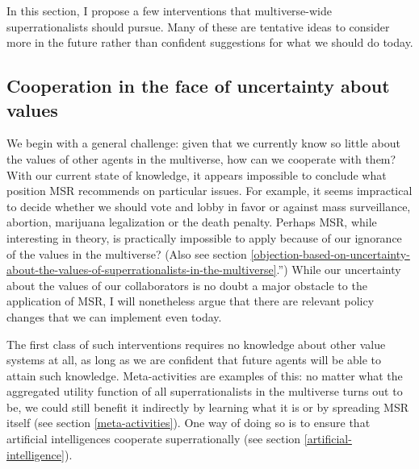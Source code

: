 In this section, I propose a few interventions that multiverse-wide
superrationalists should pursue. Many of these are tentative ideas to
consider more in the future rather than confident suggestions for what
we should do today.

\hypertarget{cooperation-in-the-face-of-uncertainty-about-values}{\subsection{Cooperation
in the face of uncertainty about
values}\label{cooperation-in-the-face-of-uncertainty-about-values}}

We begin with a general challenge: given that we currently know so
little about the values of other agents in the multiverse, how can we
cooperate with them? With our current state of knowledge, it appears
impossible to conclude what position MSR recommends on particular
issues. For example, it seems impractical to decide whether we should
vote and lobby in favor or against mass surveillance, abortion,
marijuana legalization or the death penalty. Perhaps MSR, while
interesting in theory, is practically impossible to apply because of our
ignorance of the values in the multiverse? (Also see section
\ref{objection-based-on-uncertainty-about-the-values-of-superrationalists-in-the-multiverse}.'') While our uncertainty about the values of our
collaborators is no doubt a major obstacle to the application of MSR, I
will nonetheless argue that there are relevant policy changes that we
can implement even today.

The first class of such interventions requires no knowledge about other
value systems at all, as long as we are confident that future agents
will be able to attain such knowledge. Meta-activities are examples of
this: no matter what the aggregated utility function of all
superrationalists in the multiverse turns out to be, we could still
benefit it indirectly by learning what it is or by spreading MSR itself
(see section
\ref{meta-activities}). One
way of doing so is to ensure that artificial intelligences cooperate
superrationally (see section
\ref{artificial-intelligence}).

